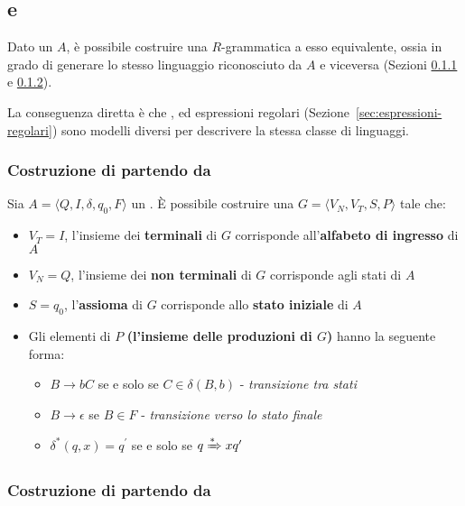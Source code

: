\documentclass[italian, 10pt]{article}
\begin{document}
\subsection{\RG e \FSA}

Dato un \FSA \(A\), è possibile costruire una \(R\)-grammatica a esso equivalente, ossia in grado di generare lo stesso linguaggio riconosciuto da \(A\) e viceversa (Sezioni \ref{sec:RG-da-FSA} e \ref{sec:FSA-da-RG}).

La conseguenza diretta è che \RG, \FSA ed espressioni regolari (Sezione~\ref{sec:espressioni-regolari}) sono modelli diversi per descrivere la stessa classe di linguaggi.

\subsubsection{Costruzione di \RG partendo da \FSA}
\label{sec:RG-da-FSA}

Sia \(A = \langle Q, I, \delta, q_0, F \rangle\) un \FSA.
È possibile costruire una \RG \(G = \langle V_N, V_T,  S, P \rangle\) tale che:

\begin{itemize}
  \item \(V_T = I\), l'insieme dei \textbf{terminali} di \(G\) corrisponde all'\textbf{alfabeto di ingresso} di \(A\)
  \item \(V_N = Q\), l'insieme dei \textbf{non terminali} di \(G\) corrisponde agli stati di \(A\)
  \item \(S = q_0\), l'\textbf{assioma} di \(G\) corrisponde allo \textbf{stato iniziale} di \(A\)
  \item Gli elementi di \(P\) \textbf{(l'insieme delle produzioni di \(G\))} hanno la seguente forma:
        \begin{itemize}
          \item \(B \rightarrow bC\) se e solo se \(C \in \delta(B, b)\) - \textit{transizione tra stati}
          \item \(B \rightarrow \epsilon\) se \(B \in F\) - \textit{transizione verso lo stato finale}
          \item \(\delta^\ast(q, x) = q^\prime\) se e solo se \(q \xRightarrow[]{\ast} x q^\prime\)
        \end{itemize}
\end{itemize}

\subsubsection{Costruzione di \FSA partendo da \RG}
\label{sec:FSA-da-RG}
\end{document}
